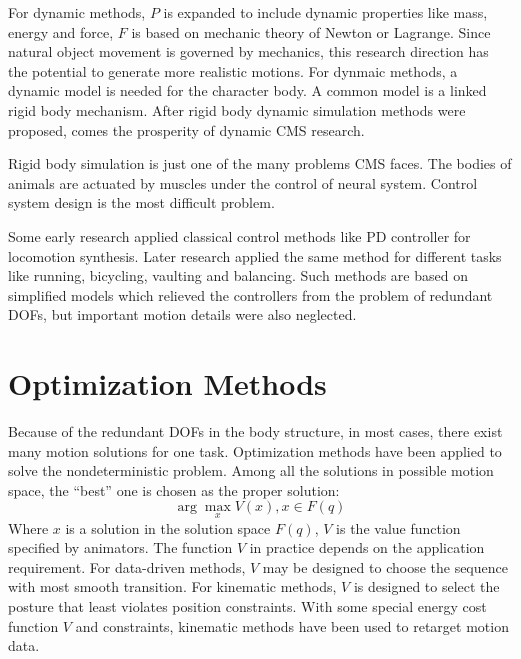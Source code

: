 For dynamic methods, $P$ is expanded to include dynamic properties like mass, energy and force, $F$ is based on mechanic theory of Newton or Lagrange.
Since natural object movement is governed by mechanics, this research direction has the potential to generate more realistic motions. 
For dynmaic methods, a dynamic model is needed for the character body. 
A common model is a linked rigid body mechanism.
After rigid body dynamic simulation methods\citep{Baraff1994,Mirtich1996,Stewart2000} were proposed, comes the prosperity of dynamic CMS research. 

Rigid body simulation is just one of the many problems CMS faces. 
The bodies of animals are actuated by muscles under the control of neural system. 
Control system design is the most difficult problem.

Some early research applied classical control methods like PD controller \citep{Raibert1991} for locomotion synthesis.
Later research \citep{Hodgins1995} applied the same method for different tasks like running, bicycling, vaulting and balancing. 
Such methods are based on simplified models which relieved the controllers from the problem of redundant DOFs, 
but important motion details were also neglected.
\section{Optimization Methods}
\label{sec:optimization}
Because of the redundant DOFs in the body structure, in most cases, there exist many motion solutions for one task.
Optimization methods have been applied to solve the nondeterministic problem. 
Among all the solutions in possible motion space, the ``best'' one is chosen as the proper solution:
\begin{equation}
\label{equ:max_select}
\arg\max_x V(x), x\in F(q)
\end{equation}
Where $x$ is a solution in the solution space $F(q)$, $V$ is the value function specified by animators. 
The function $V$ in practice depends on the application requirement.
For data-driven methods, $V$ may be designed to choose the sequence with most smooth transition.
For kinematic methods, $V$ is designed to select the posture that least violates position constraints\citep{boulic1996hierarchical}. 
With some special energy cost function $V$ and constraints, kinematic methods have been used to retarget motion data\citep{Gleicher1998,Gleicher1998a}.


